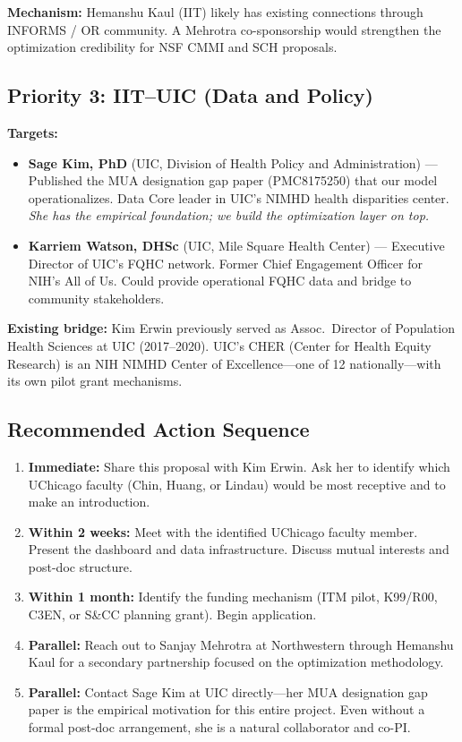 \documentclass[11pt]{article}
\begin{document}
\textbf{Mechanism:} Hemanshu Kaul (IIT) likely has existing connections through INFORMS / OR community. A Mehrotra co-sponsorship would strengthen the optimization credibility for NSF CMMI and SCH proposals.

\subsection*{Priority 3: IIT--UIC (Data and Policy)}

\textbf{Targets:}
\begin{itemize}[nosep]
    \item \textbf{Sage Kim, PhD} (UIC, Division of Health Policy and Administration) --- Published the MUA designation gap paper (PMC8175250) that our model operationalizes. Data Core leader in UIC's NIMHD health disparities center. \textit{She has the empirical foundation; we build the optimization layer on top.}
    \item \textbf{Karriem Watson, DHSc} (UIC, Mile Square Health Center) --- Executive Director of UIC's FQHC network. Former Chief Engagement Officer for NIH's All of Us. Could provide operational FQHC data and bridge to community stakeholders.
\end{itemize}

\textbf{Existing bridge:} Kim Erwin previously served as Assoc.\ Director of Population Health Sciences at UIC (2017--2020). UIC's CHER (Center for Health Equity Research) is an NIH NIMHD Center of Excellence---one of 12 nationally---with its own pilot grant mechanisms.

\subsection*{Recommended Action Sequence}

\begin{enumerate}
    \item \textbf{Immediate:} Share this proposal with Kim Erwin. Ask her to identify which UChicago faculty (Chin, Huang, or Lindau) would be most receptive and to make an introduction.
    \item \textbf{Within 2 weeks:} Meet with the identified UChicago faculty member. Present the dashboard and data infrastructure. Discuss mutual interests and post-doc structure.
    \item \textbf{Within 1 month:} Identify the funding mechanism (ITM pilot, K99/R00, C3EN, or S\&CC planning grant). Begin application.
    \item \textbf{Parallel:} Reach out to Sanjay Mehrotra at Northwestern through Hemanshu Kaul for a secondary partnership focused on the optimization methodology.
    \item \textbf{Parallel:} Contact Sage Kim at UIC directly---her MUA designation gap paper is the empirical motivation for this entire project. Even without a formal post-doc arrangement, she is a natural collaborator and co-PI.
\end{enumerate}
\end{document}
